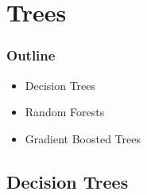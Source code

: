\section{Trees}

\begin{frame}
	\frametitle{Outline}
	
	\begin{itemize}
		\item Decision Trees
		\item Random Forests
		\item Gradient Boosted Trees
	\end{itemize}
\end{frame}

\subsection{Decision Trees}

